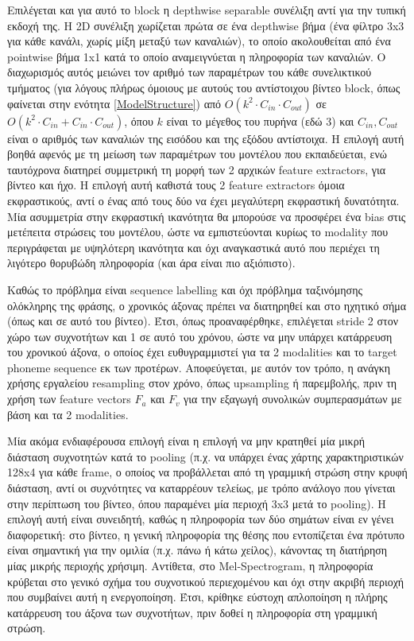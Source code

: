 Επιλέγεται και για αυτό το block η depthwise separable συνέλιξη αντί για την τυπική εκδοχή της. Η 2D συνέλιξη χωρίζεται πρώτα σε ένα depthwise βήμα (ένα φίλτρο 3x3 για κάθε κανάλι, χωρίς μίξη μεταξύ των καναλιών), το οποίο ακολουθείται από ένα pointwise βήμα 1x1 κατά το οποίο αναμειγνύεται η πληροφορία των καναλιών. Ο διαχωρισμός αυτός μειώνει τον αριθμό των παραμέτρων του κάθε συνελικτικού τμήματος (για λόγους πλήρως όμοιους με αυτούς του αντίστοιχου βίντεο block, όπως φαίνεται στην ενότητα \ref{ModelStructure}) από $O(k^2 \cdot C_{in} \cdot C_{out})$ σε $O(k^2 \cdot C_{in} + C_{in} \cdot C_{out})$, όπου $k$ είναι το μέγεθος του πυρήνα (εδώ 3) και $C_{in}, C_{out}$ είναι ο αριθμός των καναλιών της εισόδου και της εξόδου αντίστοιχα. Η επιλογή αυτή βοηθά αφενός με τη μείωση των παραμέτρων του μοντέλου που εκπαιδεύεται, ενώ ταυτόχρονα διατηρεί συμμετρική τη μορφή των 2 αρχικών feature extractors, για βίντεο και ήχο. Η επιλογή αυτή καθιστά τους 2 feature extractors όμοια εκφραστικούς, αντί ο ένας από τους δύο να έχει μεγαλύτερη εκφραστική δυνατότητα. Μία ασυμμετρία στην εκφραστική ικανότητα θα μπορούσε να προσφέρει ένα bias στις μετέπειτα στρώσεις του μοντέλου, ώστε να εμπιστεύονται κυρίως το modality που περιγράφεται με  υψηλότερη ικανότητα και όχι αναγκαστικά αυτό που περιέχει τη λιγότερο θορυβώδη πληροφορία (και άρα είναι πιο αξιόπιστο).

Καθώς το πρόβλημα είναι sequence labelling και όχι πρόβλημα ταξινόμησης ολόκληρης της φράσης, ο χρονικός άξονας πρέπει να διατηρηθεί και στο ηχητικό σήμα (όπως και σε αυτό του βίντεο). Έτσι, όπως προαναφέρθηκε, επιλέγεται stride 2 στον χώρο των συχνοτήτων και 1 σε αυτό του χρόνου, ώστε να μην υπάρχει κατάρρευση του χρονικού άξονα, ο οποίος έχει ευθυγραμμιστεί για τα 2 modalities και το target phoneme sequence εκ των προτέρων. Αποφεύγεται, με αυτόν τον τρόπο, η ανάγκη χρήσης εργαλείου resampling στον χρόνο, όπως upsampling ή παρεμβολής, πριν τη χρήση των feature vectors $F_a$ και $F_v$ για την εξαγωγή συνολικών συμπερασμάτων με βάση και τα 2 modalities.

Μία ακόμα ενδιαφέρουσα επιλογή είναι η επιλογή να μην κρατηθεί μία μικρή διάσταση συχνοτητών κατά το pooling (π.χ. να υπάρχει ένας χάρτης χαρακτηριστικών 128x4 για κάθε frame, ο οποίος να προβάλλεται από τη γραμμική στρώση στην κρυφή διάσταση, αντί οι συχνότητες να καταρρέουν τελείως, με τρόπο ανάλογο που γίνεται στην περίπτωση του βίντεο, όπου παραμένει μία περιοχή 3x3 μετά το pooling). Η επιλογή αυτή είναι συνειδητή, καθώς η πληροφορία των δύο σημάτων είναι εν γένει διαφορετική: στο βίντεο, η γενική πληροφορία της θέσης που εντοπίζεται ένα πρότυπο είναι σημαντική για την ομιλία (π.χ. πάνω ή κάτω χείλος), κάνοντας τη διατήρηση μίας μικρής περιοχής χρήσιμη. Αντίθετα, στο Mel-Spectrogram, η πληροφορία κρύβεται στο γενικό σχήμα του συχνοτικού περιεχομένου και όχι στην ακριβή περιοχή που συμβαίνει αυτή η ενεργοποίηση. Έτσι, κρίθηκε εύστοχη απλοποίηση η πλήρης κατάρρευση του άξονα των συχνοτήτων, πριν δοθεί η πληροφορία στη γραμμική στρώση.

